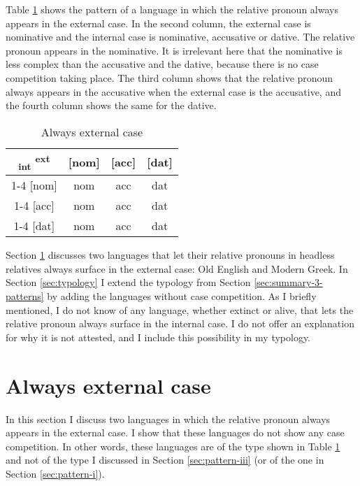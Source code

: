 Table \ref{tbl:no-case-competition-ext} shows the pattern of a language in which the relative pronoun always appears in the external case. In the second column, the external case is nominative and the internal case is nominative, accusative or dative. The relative pronoun appears in the nominative. It is irrelevant here that the nominative is less complex than the accusative and the dative, because there is no case competition taking place. The third column shows that the relative pronoun always appears in the accusative when the external case is the accusative, and the fourth column shows the same for the dative.

\begin{table}[ht]
  \center
  \caption{Always external case}
  \begin{tabular}{c|c|c|c}
    \toprule
   \textsubscript{\ac{int}} \textsuperscript{\ac{ext}}
          & [\ac{nom}]
          & [\ac{acc}]
          & [\ac{dat}]
          \\ \cmidrule{1-4}
      [\ac{nom}]
          & \ac{nom}
          & \ac{acc}
          & \ac{dat}
          \\ \cmidrule{1-4}
      [\ac{acc}]
          & \ac{nom}
          & \ac{acc}
          & \ac{dat}
          \\ \cmidrule{1-4}
      [\ac{dat}]
          & \ac{nom}
          & \ac{acc}
          & \ac{dat}
          \\
    \bottomrule
  \end{tabular}
  \label{tbl:no-case-competition-ext}
\end{table}

Section \ref{sec:always-ext} discusses two languages that let their relative pronouns in headless relatives always surface in the external case: Old English and Modern Greek. In Section \ref{sec:typology} I extend the typology from Section \ref{sec:summary-3-patterns} by adding the languages without case competition. As I briefly mentioned, I do not know of any language, whether extinct or alive, that lets the relative pronoun always surface in the internal case. I do not offer an explanation for why it is not attested, and I include this possibility in my typology.

\section{Always external case}\label{sec:always-ext}

In this section I discuss two languages in which the relative pronoun always appears in the external case. I show that these languages do not show any case competition. In other words, these languages are of the type shown in Table \ref{tbl:no-case-competition-ext} and not of the type I discussed in Section \ref{sec:pattern-iii} (or of the one in Section \ref{sec:pattern-i}).

